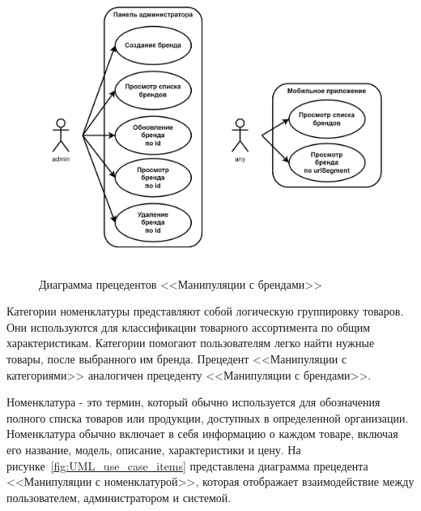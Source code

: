 \begin{figure}[!htb]
    \centering

    \includegraphics[height=9.5cm]
    {images/UML/use_case/brands/brands.png}

    \caption{Диаграмма прецедентов <<Манипуляции с брендами>>}

    \label{fig:UML_use_case_item_brands}
\end{figure}

Категории номенклатуры представляют собой логическую группировку товаров.
Они используются для классификации товарного ассортимента по общим характеристикам.
Категории помогают пользователям легко найти нужные товары, после выбранного им бренда.
Прецедент <<Манипуляции с категориями>> аналогичен прецеденту <<Манипуляции с брендами>>.

Номенклатура - это термин, который обычно используется для обозначения полного списка товаров или продукции,
доступных в определенной организации.
Номенклатура обычно включает в себя информацию о каждом товаре, включая его название, модель, описание, характеристики и цену.
На рисунке~\ref{fig:UML_use_case_items} представлена диаграмма прецедента <<Манипуляции с номенклатурой>>,
которая отображает взаимодействие между пользователем, администратором и системой.

